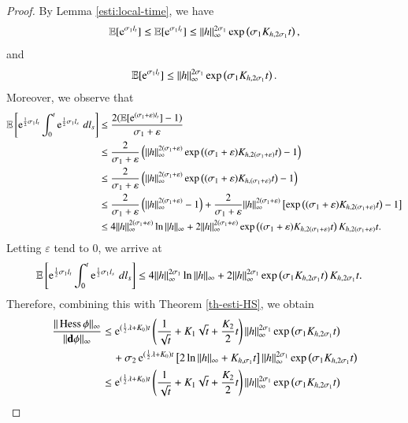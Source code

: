 \documentclass[11pt,reqno]{amsart}
\theoremstyle{definition} \newtheorem{remark}[theorem]{Remark}
\numberwithin{equation}{section}
\newcommand{\eps}{\varepsilon}
\newcommand\1{\mathbbm{1}}
\def\bd{{\bf d}}
\def\r{\right}
\def\l{\left} \def\e{\operatorname{e}} \def\dsum{\displaystyle\sum}
\begin{document}
\begin{proof}
By Lemma \ref{esti:local-time}, we have
\begin{align*}
 \E[\e^{\sigma_1 l_t}]
 \leq \E[\e^{\sigma_1 l_t}] \leq \|h\|_{\infty}^{2\sigma_1 }\exp \l(\sigma_1K_{h,2\sigma_1} t\r),
\end{align*}
and 
\begin{align*}
\E[\e^{\sigma_1 l_t}]\leq \|h\|_{\infty}^{2\sigma_1 }\exp \l(\sigma_1K_{h,2\sigma_1 } t\r).
\end{align*}
Moreover, we observe that
\begin{align*}
\E\l[\e^{\frac{1}{2}\sigma_1l_t}\int_0^t \e^{\frac{1}{2}\sigma_1l_s}\, d l_s\r]&\leq \frac{2(\E[\e^{(\sigma_1+\eps)l_t}]-1)}{\sigma_1+\eps}\\
&\leq \frac{2}{\sigma_1+\eps} \l(\|h\|_{\infty}^{2(\sigma_1+\eps)}\exp\l((\sigma_1+\eps)K_{h, 2(\sigma_1+\eps)}t\r)-1\r)\\
&\leq \frac{2}{\sigma_1+\eps}\l(\|h\|_{\infty}^{2(\sigma_1+\eps)}\exp\l((\sigma_1+\eps)K_{h, (\sigma_1+\eps)}t\r)-1\r)\\
&\leq \frac{2}{\sigma_1+\eps}\l(\|h\|_{\infty}^{2(\sigma_1+\eps)}-1\r)+\frac{2}{\sigma_1+\eps}\|h\|_{\infty}^{2(\sigma_1+\eps)}\l[\exp\l((\sigma_1+\eps)K_{h, 2(\sigma_1+\eps)}t\r)-1\r]\\
&\leq 4\|h\|_{\infty}^{2(\sigma_1+\eps)} \ln \|h\|_{\infty}+2\|h\|_{\infty}^{2(\sigma_1+\eps)}\exp\l((\sigma_1+\eps)K_{h, 2(\sigma_1+\eps)}t\r)K_{h, 2(\sigma_1+\eps)}t.
\end{align*}
Letting $\eps$ tend to $0$, we arrive at
\begin{align*}
\E\l[\e^{\frac{1}{2}\sigma_1l_t}\int_0^t \e^{\frac{1}{2}\sigma_1l_s}\, d l_s\r]&\leq 4\|h\|_{\infty}^{2\sigma_1} \ln \|h\|_{\infty}+2\|h\|_{\infty}^{2\sigma_1}\exp\l(\sigma_1K_{h, 2\sigma_1}t\r)K_{h,2\sigma_1}t.
\end{align*}
Therefore, combining this with Theorem \ref{th-esti-HS}, we obtain
\begin{align*}
\frac{\|\Hess \phi\|_{\infty}}{\|\bd \phi\|_{\infty}}&\leq  \e^{(\frac12\lambda +K_0)t}\l(\frac{1}{\sqrt{t}}+K_1 \sqrt{t}+\frac{K_2}{2} t \r)\|h\|_{\infty}^{2\sigma_1 }\exp \l(\sigma_1K_{h,2\sigma_1} t\r)\\
&\quad +\sigma_2\e^{(\frac12\lambda+K_0)t}\l[2 \ln \|h\|_{\infty}+K_{h,\sigma_1}t\r]\|h\|_{\infty}^{2\sigma_1 }\exp \l(\sigma_1K_{h,2\sigma_1} t\r)\\
&\leq  \e^{(\frac12\lambda +K_0)t}\l(\frac{1}{\sqrt{t}}+K_1 \sqrt{t}+\frac{K_2}{2} t \r)\|h\|_{\infty}^{2\sigma_1 }\exp \l(\sigma_1K_{h,2\sigma_1} t\r)\\

\end{align*}
\end{proof}
\end{document}
